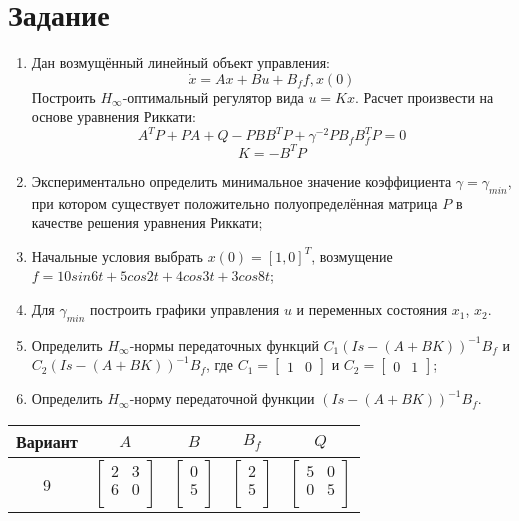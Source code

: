\documentclass[14pt, a4paper]{extarticle}
\begin{document}
	\onehalfspacing
	
	\setcounter{page}{2}
	
	\section*{Задание}
	
	\begin{enumerate}
		\item Дан возмущённый линейный объект управления:
		$$\dot{x}=Ax+Bu+B_ff,x(0)$$
		Построить $H_\infty$-оптимальный регулятор вида $u=Kx$. Расчет произвести на основе уравнения Риккати:
		$$A^TP+PA+Q-PBB^TP+\gamma^{-2}PB_fB_f^TP=0$$
		$$K=-B^TP$$
		\item Экспериментально определить минимальное значение коэффициента $\gamma=\gamma_{min}$, при котором существует положительно полуопределённая матрица $P$ в качестве решения уравнения Риккати;
		\item Начальные условия выбрать $x(0)=[1,0]^T$, возмущение $f=10sin6t+5cos2t+4cos3t+3cos8t$;
		\item Для $\gamma_{min}$ построить графики управления $u$ и переменных состояния $x_1$, $x_2$.
		\item Определить $H_\infty$-нормы передаточных функций $C_1(Is-(A+BK))^{-1}B_f$ и $C_2(Is-(A+BK))^{-1}B_f$, где $C_1=\left[\begin{matrix}1 & 0\end{matrix}\right]$ и $C_2=\left[\begin{matrix}0 & 1\end{matrix}\right]$;
		\item Определить $H_\infty$-норму передаточной функции $(Is-(A+BK))^{-1}B_f$.
	\end{enumerate}
	\begin{table}[H]
		\centering
		\begin{tabular}{|c|c|c|c|c|}
			\hline
			Вариант & $A$ & $B$ & $B_f$ & $Q$ \\\hline
			9 & 
			$\left[\begin{matrix}
				2 & 3 \\
				6 & 0 \\
			\end{matrix}\right]$ & 
			$\left[\begin{matrix}
				0 \\ 5 \\
			\end{matrix}\right]$ &
			$\left[\begin{matrix}
				2 \\ 5 \\
			\end{matrix}\right]$ & 
			$\left[\begin{matrix}
				5 & 0 \\
				0 & 5 \\
			\end{matrix}\right]$ \\\hline
		\end{tabular}
	\end{table}
	
\end{document}
